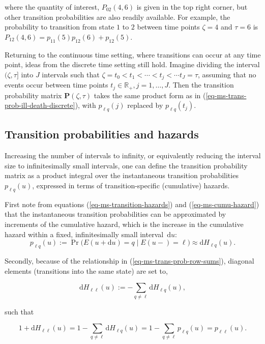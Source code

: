 \documentclass[
  letterpaper,
  krantz2]{style/krantz}
\begin{document}
where the quantity of interest, \(P_{02}(4, 6)\) is given in the top
right corner, but other transition probabilities are also readily
available. For example, the probability to transition from state \(1\)
to \(2\) between time points \(\zeta=4\) and \(\tau=6\) is
\(P_{12}(4, 6) = p_{11}(5)p_{12}(6) + p_{12}(5)\).

Returning to the continuous time setting, where transitions can occur at
any time point, ideas from the discrete time setting still hold. Imagine
dividing the interval \((\zeta, \tau]\) into \(J\) intervals such that
\(\zeta = t_{0} < t_{1} < \cdots < t_{j} < \cdots t_{J} = \tau\),
assuming that no events occur between time points
\(t_{j} \in \mathbb{R}_+, j=1,\ldots, J\). Then the transition
probability matrix \(\mathbf{P}(\zeta, \tau)\) takes the same product
form as in (\ref{eq-ms-trans-prob-ill-death-discrete}), with
\(p_{\ell q}(j)\) replaced by \(p_{\ell q}(t_j)\).

\subsection{Transition probabilities and
hazards}\label{transition-probabilities-and-hazards}

Increasing the number of intervals to infinity, or equivalently reducing
the interval size to infinitesimally small intervals, one can define the
transition probability matrix as a
product integral over the instantaneous transition probabilities
\(p_{\ell q}(u)\), expressed in terms of transition-specific
(cumulative) hazards.

First note from equations (\ref{eq-ms-transition-hazards}) and
(\ref{eq-ms-cumu-hazard}) that the instantaneous transition
probabilities can be approximated by increments of the cumulative
hazard, which is the increase in the cumulative hazard within a fixed,
infinitesimally small interval \(\,\mathrm{d}u\): \[
p_{\ell q}(u) := \Pr\big(E(u+\mathrm{d}u)=q \mid E(u-) = \ell\big) \approx \mathrm{d}H_{\ell q}(u).
\]

Secondly, because of the relationship in
(\ref{eq-ms-trans-prob-row-sums}), diagonal elements (transitions into
the same state) are set to,

\[
\mathrm{d}H_{\ell \ell}(u) := -\sum_{q \neq \ell} \mathrm{d}H_{\ell q}(u),
\]

such that

\[
1 + \mathrm{d}H_{\ell\ell}(u) = 1-\sum_{q \neq \ell} \mathrm{d}H_{\ell q}(u) = 1 - \sum_{q\neq \ell}p_{\ell q}(u) = p_{\ell\ell}(u).
\]
\end{document}
